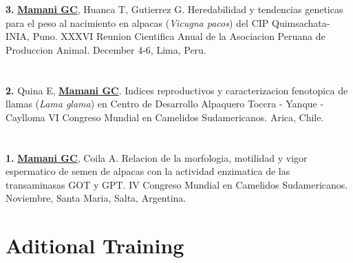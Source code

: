 \documentclass[margin,line,10pt]{res}
\newenvironment{list1}{
  \begin{list}{\ding{113}}{%
      \setlength{\itemsep}{0in}
      \setlength{\parsep}{0in} \setlength{\parskip}{0in}
      \setlength{\topsep}{0in} \setlength{\partopsep}{0in} 
      \setlength{\leftmargin}{0.17in}}}{\end{list}}
\begin{document}
\begin{resume}
\begin{list1}
\item [\bf{3}.] {\bf \underline{Mamani GC}}, Huanca T, Gutierrez G.
Heredabilidad y tendencias geneticas para el peso al nacimiento en alpacas (\textit{Vicugna pacos}) del CIP Quimsachata-INIA, Puno.
XXXVI Reunion Cientifica Anual de la Asociacion Peruana de Produccion Animal. December 4-6, Lima, Peru. 
\end{list1}
\vspace{0.5cm}

\section{}
\begin{list1}
\item [\bf{2}.] Quina E, {\bf \underline{Mamani GC}}.
Indices reproductivos y caracterizacion fenotopica de llamas (\textit{Lama glama}) en Centro de Desarrollo Alpaquero Toccra - Yanque -Caylloma
VI Congreso Mundial en Camelidos Sudamericanos. Arica, Chile. 
\end{list1}
\vspace{0.5cm}

\section{}
\begin{list1}
\item [\bf{1}.] {\bf \underline{Mamani GC}}, Coila A.
Relacion de la morfologia, motilidad y vigor espermatico de semen de alpacas con la actividad enzimatica de las transaminasas GOT y GPT.
IV Congreso Mundial en Camelidos Sudamericanos. Noviembre, Santa Maria, Salta, Argentina. 
\end{list1}




\vspace{2cm}
\section{\sc Aditional Training} 
\vspace{2cm}

\section{}


\end{resume}
\end{document}
